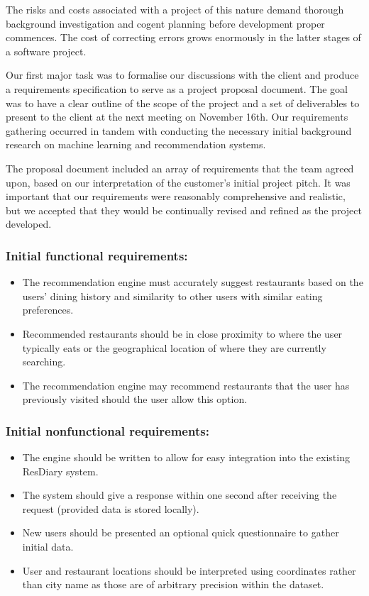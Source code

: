 \documentclass{l3proj}
\begin{document}
The risks and costs associated with a project of this nature demand thorough background investigation and cogent planning before development proper commences. The cost of correcting errors grows enormously in the latter stages of a software project.

Our first major task was to formalise our discussions with the client and produce a requirements specification to serve as a project proposal document. The goal was to have a clear outline of the scope of the project and a set of deliverables to present to the client at the next meeting on November 16th. Our requirements gathering occurred in tandem with conducting the necessary initial background research on machine learning and recommendation systems. 

The proposal document included an array of requirements that the team agreed upon, based on our interpretation of the customer's initial project pitch. It was important that our requirements were reasonably comprehensive and realistic, but we accepted that they would be continually revised and refined as the project developed. 

\subsubsection{Initial functional requirements:}
\begin{itemize}
\item The recommendation engine must accurately suggest restaurants based on the users' dining history and similarity to other users with similar eating preferences.
\item Recommended restaurants should be in close proximity to where the user typically eats or the geographical location of where they are currently searching.
\item The recommendation engine may recommend restaurants that  the user has previously visited should the user allow this option.
\end{itemize}

\subsubsection{Initial nonfunctional requirements:}
\begin{itemize}
\item The engine should be written to allow for easy integration into the existing ResDiary system.
\item The system should give a response within one second after receiving the request (provided data is stored locally).
\item New users should be presented an optional quick questionnaire to gather initial data.
\item User and restaurant locations should be interpreted using coordinates rather than city name as those are of arbitrary precision within the dataset.
\end{itemize}
\end{document}
